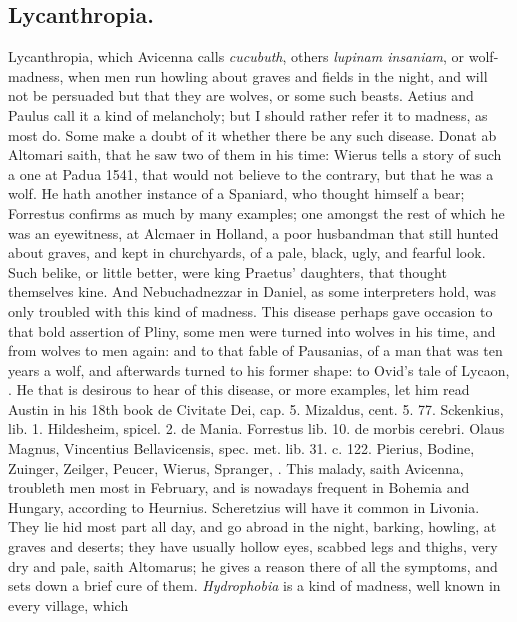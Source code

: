 {\subsection{Lycanthropia.}
Lycanthropia, which Avicenna calls \emph{cucubuth}, others
\emph{lupinam insaniam}, or wolf-madness, when men run howling about graves
and fields in the night, and will not be persuaded but that they are
wolves, or some such beasts. Aetius and Paulus call it a kind
of melancholy; but I should rather refer it to madness, as most do.
Some make a doubt of it whether there be any such disease. Donat
ab Altomari saith, that he saw two of them in his time: Wierus
tells a story of such a one at Padua 1541, that would not believe to
the contrary, but that he was a wolf. He hath another instance of a
Spaniard, who thought himself a bear; Forrestus confirms as much
by many examples; one amongst the rest of which he was an eyewitness,
at Alcmaer in Holland, a poor husbandman that still hunted about
graves, and kept in churchyards, of a pale, black, ugly, and fearful
look. Such belike, or little better, were king Praetus' daughters,
that thought themselves kine. And Nebuchadnezzar in Daniel, as some
interpreters hold, was only troubled with this kind of madness. This
disease perhaps gave occasion to that bold assertion of Pliny,
some men were turned into wolves in his time, and from wolves to men
again: and to that fable of Pausanias, of a man that was ten years a
wolf, and afterwards turned to his former shape: to Ovid's tale of
Lycaon, \etc{}. He that is desirous to hear of this disease, or more
examples, let him read Austin in his 18th book de Civitate Dei, cap. 5.
Mizaldus, cent. 5. 77. Sckenkius, lib. 1. Hildesheim, spicel. 2. de
Mania. Forrestus lib. 10. de morbis cerebri. Olaus Magnus, Vincentius
Bellavicensis, spec. met. lib. 31. c. 122. Pierius, Bodine, Zuinger,
Zeilger, Peucer, Wierus, Spranger, \etc{}. This malady, saith Avicenna,
troubleth men most in February, and is nowadays frequent in Bohemia and
Hungary, according to Heurnius. Scheretzius will have it common in
Livonia. They lie hid most part all day, and go abroad in the night,
barking, howling, at graves and deserts; they have usually hollow
eyes, scabbed legs and thighs, very dry and pale, saith Altomarus;
he gives a reason there of all the symptoms, and sets down a brief cure
of them.
\emph{Hydrophobia} is a kind of madness, well known in every village, which
}
